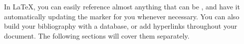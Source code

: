 In \LaTeX, you can easily \gls{reference} almost anything that can be , and have it automatically updating the marker for you whenever necessary. You can also build your bibliography with a  database, or add \glspl{hyperlink} throughout your document. The following sections will cover them separately.